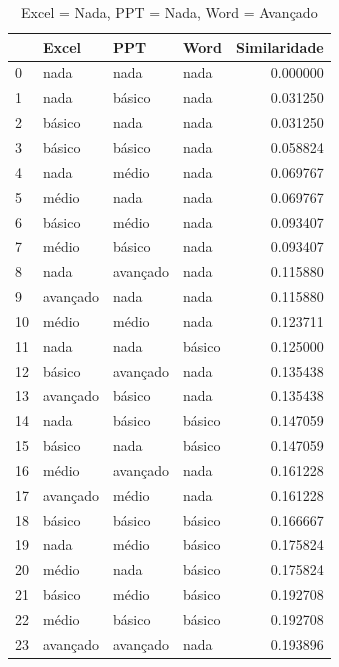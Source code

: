 \documentclass[]{article}
\begin{document}
	
	\begin{longtable}{|llll|r|} 
		\caption{Excel = Nada, PPT = Nada, Word = Avançado}
		\label{variability_impl_mech}
		\endfirsthead
		\endhead
		
		\hline
		{} & Excel     & PPT       & Word      & Similaridade \\
		\hline
		0  & nada      & nada      & nada      & 0.000000     \\
		1  & nada      & básico   & nada      & 0.031250     \\
		2  & básico   & nada      & nada      & 0.031250     \\
		3  & básico   & básico   & nada      & 0.058824     \\
		4  & nada      & médio    & nada      & 0.069767     \\
		5  & médio    & nada      & nada      & 0.069767     \\
		6  & básico   & médio    & nada      & 0.093407     \\
		7  & médio    & básico   & nada      & 0.093407     \\
		8  & nada      & avançado & nada      & 0.115880     \\
		9  & avançado & nada      & nada      & 0.115880     \\
		10 & médio    & médio    & nada      & 0.123711     \\
		11 & nada      & nada      & básico   & 0.125000     \\
		12 & básico   & avançado & nada      & 0.135438     \\
		13 & avançado & básico   & nada      & 0.135438     \\
		14 & nada      & básico   & básico   & 0.147059     \\
		15 & básico   & nada      & básico   & 0.147059     \\
		16 & médio    & avançado & nada      & 0.161228     \\
		17 & avançado & médio    & nada      & 0.161228     \\
		18 & básico   & básico   & básico   & 0.166667     \\
		19 & nada      & médio    & básico   & 0.175824     \\
		20 & médio    & nada      & básico   & 0.175824     \\
		21 & básico   & médio    & básico   & 0.192708     \\
		22 & médio    & básico   & básico   & 0.192708     \\
		23 & avançado & avançado & nada      & 0.193896     \\

\end{longtable}
\end{document}
